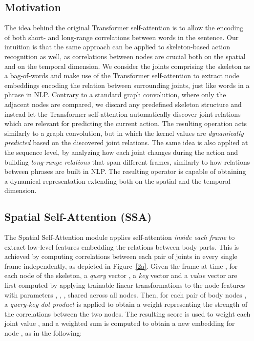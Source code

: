 \documentclass[review]{cvpr}
\begin{document}
\subsection{Motivation}
The idea behind the original Transformer self-attention is to allow the encoding of both short- and long-range correlations between words in the sentence. Our intuition is that the same approach can be applied to skeleton-based action recognition as well, as correlations between nodes are crucial both on the spatial and on the temporal dimension. 
We consider the joints comprising the skeleton as a bag-of-words and make use of the Transformer self-attention to extract node embeddings encoding the relation between surrounding joints, just like words in a phrase in NLP. Contrary to a standard graph convolution, where only the adjacent nodes are compared, we discard any predefined skeleton structure and instead let the Transformer self-attention automatically discover joint relations which are relevant for predicting the current action. The resulting operation acts similarly to a graph convolution, but in which the kernel values are \textit{dynamically predicted} based on the discovered joint relations. The same idea is also applied at the sequence level, by analyzing how each joint changes during the action and building \textit{long-range relations} that span different frames, similarly to how relations between phrases are built in NLP. The resulting operator is capable of obtaining a dynamical representation extending both on the spatial and the temporal dimension. 



 
 

\subsection{Spatial Self-Attention (SSA)}
\label{sec:ssa-descr}

The Spatial Self-Attention module applies self-attention \textit{inside each frame} to extract low-level features embedding the relations between body parts. This is achieved by computing correlations between each pair of joints in every single frame independently, as depicted in Figure~\ref{2a}. 
Given the frame at time , for each node  of the skeleton, a \textit{query} vector  , a \textit{key} vector  and a \textit{value} vector  are first computed by applying trainable linear transformations to the node features  with parameters , , , shared across all nodes. Then, for each pair of body nodes , a \textit{query-key dot product} is applied to obtain a weight  representing the strength of the correlations between the two nodes. The resulting score  is used to weight each joint value , and a weighted sum is computed to obtain a new embedding  for node , as in the following:
\end{document}
